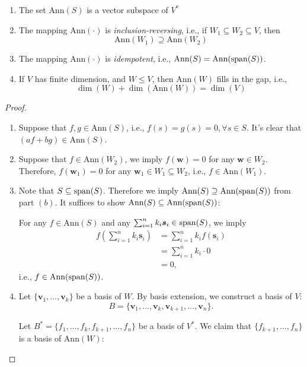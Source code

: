 \begin{proposition}
\begin{enumerate}
\item
The set $\text{Ann}(S)$ is a vector subspace of $V^*$
\item
The mapping $\text{Ann}(\cdot)$ is \emph{inclusion-reversing}, i.e., if $W_1\subseteq W_2\subseteq V$, then
\[
\text{Ann}(W_1)\supseteq\text{Ann}(W_2)
\] 
\item
The mapping $\text{Ann}(\cdot)$ is \emph{idempotent}, i.e.,
$\text{Ann}(S) = \text{Ann}(\operatorname{span}(S))$.
\item
If $V$ has finite dimension, and $W\le V$, then $\text{Ann}(W)$ fills in the gap, i.e., 
\[
\dim(W) + \dim(\text{Ann}(W)) = \dim(V)
\]
\end{enumerate}
\end{proposition}
\begin{proof}
\begin{enumerate}
\item
Suppose that $f,g\in\text{Ann}(S)$, i.e., $f(s) = g(s)=0,\forall s\in S$. 
It's clear that $(af+bg)\in\text{Ann}(S)$.
\item
Suppose that $f\in\text{Ann}(W_2)$, we imply $f(\bm w)=0$ for any $\bm w\in W_2$.
Therefore, $f(\bm w_1)=0$ for any $\bm w_1\in W_1\subseteq W_2$, i.e., $f\in\text{Ann}(W_1)$.
\item
Note that $S\subseteq\operatorname{span}(S)$. Therefore we imply $\text{Ann}(S)\supseteq\text{Ann}(\operatorname{span}(S))$ from part $(b)$.
It suffices to show $\text{Ann}(S)\subseteq\text{Ann}(\operatorname{span}(S))$:

For any $f\in \text{Ann}(S)$ and any $\sum_{i=1}^nk_i\bm s_i\in\operatorname{span}(S)$, we imply
\begin{align*}
f\left(\sum_{i=1}^nk_i\bm s_i\right)&=\sum_{i=1}^nk_if(\bm s_i)\\
&=\sum_{i=1}^nk_i\cdot 0\\
&=0,
\end{align*}
i.e., $f\in\text{Ann}(\operatorname{span}(S))$.
\item
Let $\{\bm v_1,\dots,\bm v_k\}$ be a basis of $W$.
By basis extension, we construct a basis of $V$:
\[B=\{\bm v_1,\dots,\bm v_k,\bm v_{k+1},\dots,\bm v_n\}.\] 

Let $B^*=\{f_1,\dots,f_k,f_{k+1},\dots,f_n\}$ be a basis of $V^*$. 
We claim that $\{f_{k+1},\dots,f_n\}$ is a basis of $\text{Ann}(W)$:


\end{enumerate}
\end{proof}
